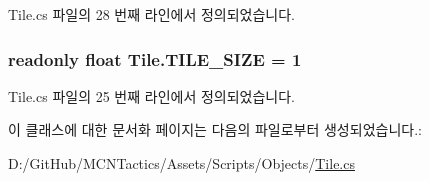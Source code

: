 Tile.\+cs 파일의 28 번째 라인에서 정의되었습니다.

\subsubsection[{\texorpdfstring{T\+I\+L\+E\+\_\+\+S\+I\+ZE}{TILE_SIZE}}]{\setlength{\rightskip}{0pt plus 5cm}readonly float Tile.\+T\+I\+L\+E\+\_\+\+S\+I\+ZE = 1\hspace{0.3cm}{\ttfamily [static]}}\hypertarget{class_tile_a51b7dea4344573ba12a461a32517e683}{}\label{class_tile_a51b7dea4344573ba12a461a32517e683}


Tile.\+cs 파일의 25 번째 라인에서 정의되었습니다.



이 클래스에 대한 문서화 페이지는 다음의 파일로부터 생성되었습니다.\+:\begin{DoxyCompactItemize}
\item 
D\+:/\+Git\+Hub/\+M\+C\+N\+Tactics/\+Assets/\+Scripts/\+Objects/\hyperlink{_tile_8cs}{Tile.\+cs}\end{DoxyCompactItemize}
